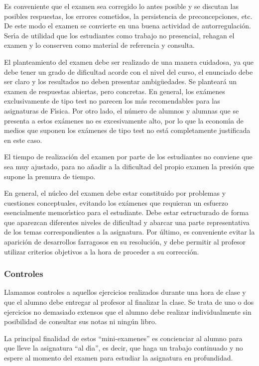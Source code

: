 Es conveniente que el examen sea corregido lo antes posible y se discutan
las posibles respuestas, los errores cometidos, la
persistencia de preconcepciones, etc. De este modo el examen se convierte
en una buena actividad de {  autorregulaci\'{o}n}.
Ser\'{\i}a de utilidad que los estudiantes como trabajo no presencial,
rehagan el examen y lo conserven como material de referencia y consulta.

El planteamiento del examen debe ser realizado de una manera cuidadosa,
 ya que debe tener un grado de dificultad acorde con el nivel del curso,
 el enunciado debe ser claro y los resultados  no deben 
presentar ambig\"uedades. Se plantear\'{a} un examen de respuestas 
abiertas, pero concretas. En general, los ex\'{a}menes exclusivamente 
de tipo test no parecen los m\'{a}s
recomendables para las asignaturas de F\'\i sica.
Por otro lado, el n\'{u}mero de alumnos  y alumnas que se presenta a estos
ex\'{a}menes no es 
excesivamente alto, por lo que la econom\'\i a de medios que
suponen los ex\'{a}menes de tipo test no est\'{a} completamente justificada
en este caso.

El tiempo de realizaci\'{o}n del examen por parte de los estudiantes  no conviene
que sea muy ajustado, para no a\~{n}adir a la dificultad del propio examen 
la presi\'{o}n que supone la premura de tiempo.

 En general, el n\'{u}cleo del examen debe estar constituido por 
problemas y cuestiones conceptuales, evitando los ex\'{a}menes que 
requieran un esfuerzo esencialmente memor\'{\i}stico para el estudiante.
 Debe estar estructurado de forma que aparezcan diferentes niveles
 de dificultad y abarcar una parte representativa de los temas
 correspondientes a la asignatura. 
Por \'{u}ltimo, es conveniente evitar la aparici\'{o}n de 
desarrollos farragosos en su resoluci\'{o}n, 
y debe permitir al profesor utilizar criterios objetivos a la
 hora de proceder a su correcci\'{o}n.

\subsubsection{Controles}
Llamamos controles a aquellos ejercicios realizados durante  una hora de 
clase y que el alumno debe
entregar al profesor al finalizar la clase.
 Se trata de uno o dos ejercicios no demasiado extensos que el alumno
 debe realizar individualmente sin posibilidad de consultar
sus notas ni ning\'{u}n libro. 

La principal finalidad de estos
 ``mini-examenes'' es concienciar
al alumno para que lleve la asignatura ``al d\'{\i}a'', es decir, que 
haga un trabajo continuado y no espere al momento del examen para estudiar
 la asignatura en profundidad. 

